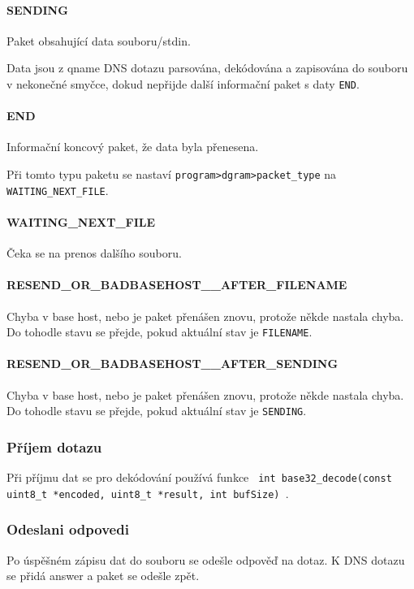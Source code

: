 \paragraph{SENDING}
Paket obsahující data souboru/stdin.

Data jsou z qname DNS dotazu parsována, dekódována a
zapisována do souboru v nekonečné smyčce, dokud nepřijde další
informační paket s daty \texttt{END}.

\paragraph{END}
Informační koncový paket, že data byla přenesena.

Při tomto typu paketu se nastaví \texttt{program\->dgram\->packet\_type} na \texttt{WAITING\_NEXT\_FILE}.

\paragraph{WAITING\_NEXT\_FILE}
Čeka se na prenos dalšího souboru.

\paragraph{RESEND\_OR\_BADBASEHOST\_\_AFTER\_FILENAME}
Chyba v base host, nebo je paket přenášen znovu, protože někde nastala chyba.
Do tohodle stavu se přejde, pokud aktuální stav je \texttt{FILENAME}.

\paragraph{RESEND\_OR\_BADBASEHOST\_\_AFTER\_SENDING}
Chyba v base host, nebo je paket přenášen znovu, protože někde nastala chyba.
Do tohodle stavu se přejde, pokud aktuální stav je \texttt{SENDING}.

\subsubsection{Příjem dotazu} \label{sec:odeslani-dotazu-s}
Při příjmu dat se pro dekódování používá funkce
\texttt{ int base32\_decode(const uint8\_t *encoded, uint8\_t *result, int bufSize) }\cite{encodingData}.

\subsubsection{Odeslani odpovedi}\label{sec:prijimani-odpovedi-s}
Po úspěšném zápisu dat do souboru se odešle odpověď na dotaz.
K DNS dotazu se přidá answer a paket se odešle zpět.
